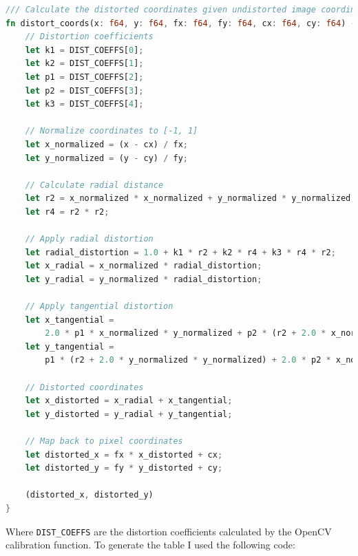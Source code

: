 \begin{lstlisting}[language=rust,breaklines,label={lst:distort_coords}]
/// Calculate the distorted coordinates given undistorted image coordinates.
fn distort_coords(x: f64, y: f64, fx: f64, fy: f64, cx: f64, cy: f64) -> (f64, f64) {
    // Distortion coefficients
    let k1 = DIST_COEFFS[0];
    let k2 = DIST_COEFFS[1];
    let p1 = DIST_COEFFS[2];
    let p2 = DIST_COEFFS[3];
    let k3 = DIST_COEFFS[4];

    // Normalize coordinates to [-1, 1]
    let x_normalized = (x - cx) / fx;
    let y_normalized = (y - cy) / fy;

    // Calculate radial distance
    let r2 = x_normalized * x_normalized + y_normalized * y_normalized;
    let r4 = r2 * r2;

    // Apply radial distortion
    let radial_distortion = 1.0 + k1 * r2 + k2 * r4 + k3 * r4 * r2;
    let x_radial = x_normalized * radial_distortion;
    let y_radial = y_normalized * radial_distortion;

    // Apply tangential distortion
    let x_tangential =
        2.0 * p1 * x_normalized * y_normalized + p2 * (r2 + 2.0 * x_normalized * x_normalized);
    let y_tangential =
        p1 * (r2 + 2.0 * y_normalized * y_normalized) + 2.0 * p2 * x_normalized * y_normalized;

    // Distorted coordinates
    let x_distorted = x_radial + x_tangential;
    let y_distorted = y_radial + y_tangential;

    // Map back to pixel coordinates
    let distorted_x = fx * x_distorted + cx;
    let distorted_y = fy * y_distorted + cy;

    (distorted_x, distorted_y)
}
\end{lstlisting}
Where \texttt{DIST\_COEFFS} are the distortion coefficients calculated by the OpenCV calibration function.
To generate the table I used the following code:
